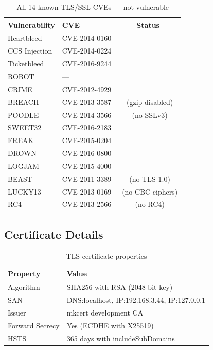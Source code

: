 \documentclass[12pt,a4paper]{article}
\newcommand{\pass}{\textcolor{success}{\checkmark}}
\begin{document}
\begin{table}[H]
\centering
\begin{tabular}{llc}
\toprule
\textbf{Vulnerability} & \textbf{CVE} & \textbf{Status} \\
\midrule
Heartbleed & CVE-2014-0160 & \pass \\
CCS Injection & CVE-2014-0224 & \pass \\
Ticketbleed & CVE-2016-9244 & \pass \\
ROBOT & --- & \pass \\
CRIME & CVE-2012-4929 & \pass \\
BREACH & CVE-2013-3587 & \pass\ (gzip disabled) \\
POODLE & CVE-2014-3566 & \pass\ (no SSLv3) \\
SWEET32 & CVE-2016-2183 & \pass \\
FREAK & CVE-2015-0204 & \pass \\
DROWN & CVE-2016-0800 & \pass \\
LOGJAM & CVE-2015-4000 & \pass \\
BEAST & CVE-2011-3389 & \pass\ (no TLS 1.0) \\
LUCKY13 & CVE-2013-0169 & \pass\ (no CBC ciphers) \\
RC4 & CVE-2013-2566 & \pass\ (no RC4) \\
\bottomrule
\end{tabular}
\caption{All 14 known TLS/SSL CVEs --- not vulnerable}
\end{table}

\subsection{Certificate Details}

\begin{table}[H]
\centering
\begin{tabular}{ll}
\toprule
\textbf{Property} & \textbf{Value} \\
\midrule
Algorithm & SHA256 with RSA (2048-bit key) \\
SAN & DNS:localhost, IP:192.168.3.44, IP:127.0.0.1 \\
Issuer & mkcert development CA \\
Forward Secrecy & Yes (ECDHE with X25519) \\
HSTS & 365 days with includeSubDomains \\
\bottomrule
\end{tabular}
\caption{TLS certificate properties}
\end{table}
\end{document}

